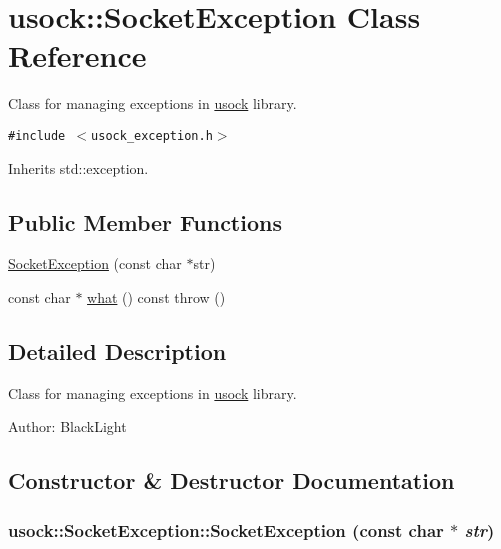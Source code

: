 \hypertarget{classusock_1_1SocketException}{
\section{usock::SocketException Class Reference}
\label{classusock_1_1SocketException}
}
Class for managing exceptions in \hyperlink{namespaceusock}{usock} library.  


{\tt \#include $<$usock\_\-exception.h$>$}

Inherits std::exception.

\subsection*{Public Member Functions}
\begin{CompactItemize}
\item 
\hyperlink{classusock_1_1SocketException_070830054f67291432f897e77bd9be48}{SocketException} (const char $\ast$str)
\item 
const char $\ast$ \hyperlink{classusock_1_1SocketException_8ad4730be89374b7ee56d56b2617f7a1}{what} () const   throw ()
\end{CompactItemize}


\subsection{Detailed Description}
Class for managing exceptions in \hyperlink{namespaceusock}{usock} library. 

\begin{Desc}
\item[Author:]BlackLight \end{Desc}


\subsection{Constructor \& Destructor Documentation}
\hypertarget{classusock_1_1SocketException_070830054f67291432f897e77bd9be48}{
\subsubsection[{SocketException}]{\setlength{\rightskip}{0pt plus 5cm}usock::SocketException::SocketException (const char $\ast$ {\em str})}}
\label{classusock_1_1SocketException_070830054f67291432f897e77bd9be48}




